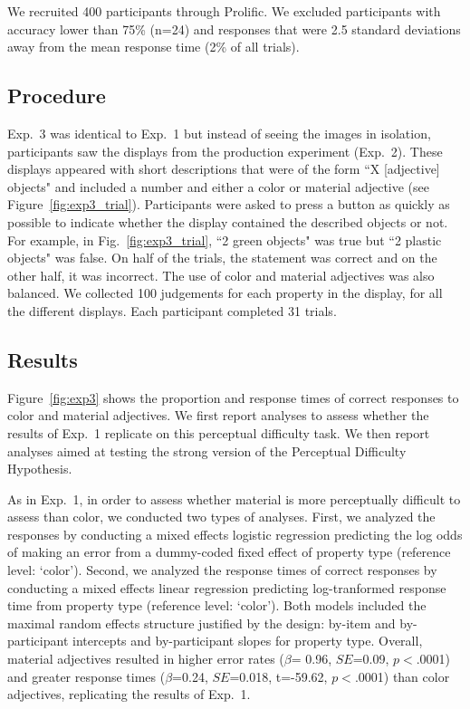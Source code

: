 \documentclass[12pt,letterpaper]{article}
\begin{document}
We recruited 400 participants through Prolific. We excluded participants with accuracy lower than 75\% (n=24) and responses that were 2.5 standard deviations away from the mean response time (2\% of all trials).
\subsection{Procedure} 

Exp.~3 was identical to Exp.~1 but instead of seeing the images in isolation, participants saw the displays from the production experiment (Exp.~2). These displays appeared with short descriptions that were of the form ``X [adjective] objects" and included a number and either a color or material adjective (see Figure~\ref{fig:exp3_trial}). Participants were asked to press a button as quickly as possible to indicate whether the display contained the described objects or not. For example, in Fig.~\ref{fig:exp3_trial}, ``2 green objects" was true but ``2 plastic objects" was false. On half of the trials, the statement was correct and on the other half, it was incorrect. The use of color and material adjectives was also balanced. We collected 100 judgements for each property in the display, for all the different displays. Each participant completed 31 trials.

\subsection{Results} 

Figure~\ref{fig:exp3} shows the proportion and response times of correct responses to color and material adjectives.  We first report analyses to assess whether the results of Exp.~1 replicate on this perceptual difficulty task. We then report analyses aimed at testing the strong version of the Perceptual Difficulty Hypothesis.

As in Exp.~1, in order to assess whether material is more perceptually difficult to assess than color, we conducted two types of analyses. First, we analyzed the responses by conducting a mixed effects logistic regression predicting the log odds of making an error from a dummy-coded fixed effect of property type (reference level: `color'). Second, we analyzed the response times of correct responses by conducting a mixed effects linear regression predicting log-tranformed response time from property type  (reference level: `color'). Both models included the maximal random effects structure justified by the design: by-item and by-participant intercepts and by-participant slopes for property type. Overall, material adjectives resulted in higher error rates ($\beta$= 0.96, $SE$=0.09, $p$$<$.0001) and greater response times ($\beta$=0.24, $SE$=0.018, t=-59.62, $p$$<$.0001) than color adjectives, replicating the results of Exp.~1. 
\end{document}
